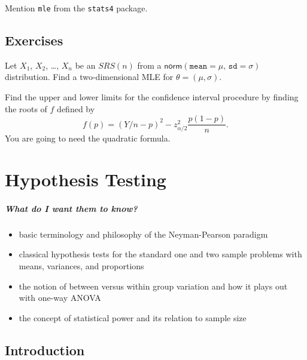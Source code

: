 \documentclass[captions=tableheading]{scrbook}
\begin{document}
\label{sec:Other-Topics}

Mention \texttt{mle} from the \texttt{stats4} package.

\newpage{}
\section{Exercises}
\label{sec-9-9}

\setcounter{thm}{0}

\begin{xca}
Let \(X_{1}\), \(X_{2}\), \ldots{}, \(X_{n}\) be an \(SRS(n)\) from a \(\mathsf{norm}(\mathtt{mean}=\mu,\,\mathtt{sd}=\sigma)\) distribution. Find a two-dimensional MLE for \(\theta=(\mu,\sigma)\).
\label{xca:norm-mu-sig-MLE}
\end{xca}

\begin{xca}
\label{xca:CI-quad-form}
Find the upper and lower limits for the confidence interval procedure by finding the roots of \(f\) defined by 
\[
f(p)=\left(Y/n-p\right)^{2}-z_{\alpha/2}^{2}\frac{p(1-p)}{n}.
\]
You are going to need the quadratic formula.
\end{xca}
\chapter{Hypothesis Testing}
\label{sec-10}

\label{cha:Hypothesis-Testing}


\paragraph*{What do I want them to know?}

\begin{itemize}
\item basic terminology and philosophy of the Neyman-Pearson paradigm
\item classical hypothesis tests for the standard one and two sample problems with means, variances, and proportions
\item the notion of between versus within group variation and how it plays out with one-way ANOVA
\item the concept of statistical power and its relation to sample size
\end{itemize}
\section{Introduction}
\label{sec-10-1}
\end{document}
